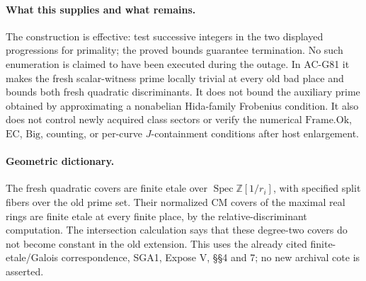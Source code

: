 \paragraph{What this supplies and what remains.}
The construction is effective: test successive integers in the two displayed progressions for primality; the proved bounds guarantee termination. No such enumeration is claimed to have been executed during the outage. In AC-G81 it makes the fresh scalar-witness prime locally trivial at every old bad place and bounds both fresh quadratic discriminants. It does not bound the auxiliary prime obtained by approximating a nonabelian Hida-family Frobenius condition. It also does not control newly acquired class sectors or verify the numerical \(\mathrm{Frame.Ok}\), \(\mathrm{EC}\), \(\mathrm{Big}\), counting, or per-curve \(J\)-containment conditions after host enlargement.

\paragraph{Geometric dictionary.}
The fresh quadratic covers are finite etale over \(\operatorname{Spec}\mathbb Z[1/r_i]\), with specified split fibers over the old prime set. Their normalized CM covers of the maximal real rings are finite etale at every finite place, by the relative-discriminant computation. The intersection calculation says that these degree-two covers do not become constant in the old extension. This uses the already cited finite-etale/Galois correspondence, SGA1, Expose V, \S\S4 and 7; no new archival cote is asserted.
